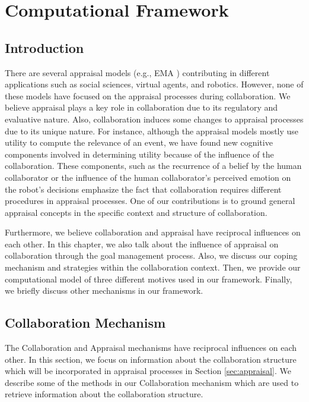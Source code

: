 \documentclass[12pt]{report}
\begin{document}
\chapter{Computational Framework}
\label{ch:appraisals}

\vspace*{-2mm}
\section{Introduction}
\vspace*{-3mm}
There are several appraisal models (e.g., EMA \cite{marsella:ema-process-model})
contributing in different applications such as social sciences, virtual agents,
and robotics. However, none of these models have focused on the appraisal
processes during collaboration. We believe appraisal plays a key role in
collaboration due to its regulatory and evaluative nature. Also, collaboration
induces some changes to appraisal processes due to its unique nature. For
instance, although the appraisal models mostly use utility to compute the
relevance of an event, we have found new cognitive components involved in
determining utility because of the influence of the collaboration. These
components, such as the recurrence of a belief by the human collaborator or the
influence of the human collaborator's perceived emotion on the robot's decisions
emphasize the fact that collaboration requires different procedures in appraisal
processes. One of our contributions is to ground general appraisal concepts in
the specific context and structure of collaboration.

Furthermore, we believe collaboration and appraisal have reciprocal influences
on each other. In this chapter, we also talk about the influence of appraisal on
collaboration through the goal management process. Also, we discuss our coping
mechanism and strategies within the collaboration context. Then, we provide
our computational model of three different motives used in our framework.
Finally, we briefly discuss other mechanisms in our framework.

\vspace*{-5mm}
\section{Collaboration Mechanism}
\vspace*{-4mm}
The Collaboration and Appraisal mechanisms have reciprocal influences on each
other. In this section, we focus on information about the collaboration
structure which will be incorporated in appraisal processes in Section
\ref{sec:appraisal}. We describe some of the methods in our Collaboration
mechanism which are used to retrieve information about the collaboration
structure.
\end{document}

